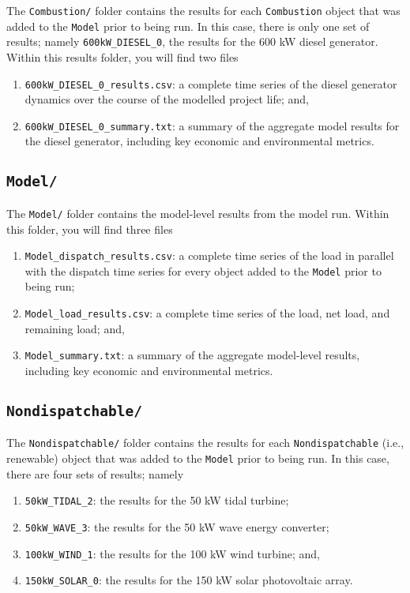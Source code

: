\documentclass[12pt, letterpaper]{report}
\begin{document}
The \texttt{Combustion/} folder contains the results for each \texttt{Combustion} object that was added to the \texttt{Model} prior to being run. In this case, there is only one set of results; namely \texttt{600kW\_DIESEL\_0}, the results for the 600 kW diesel generator. Within this results folder, you will find two files

\begin{enumerate}
    \item \texttt{600kW\_DIESEL\_0\_results.csv}: a complete time series of the diesel generator dynamics over the course of the modelled project life; and,
    \item \texttt{600kW\_DIESEL\_0\_summary.txt}: a summary of the aggregate model results for the diesel generator, including key economic and environmental metrics.
\end{enumerate}

\subsection{\texttt{Model/}}

The \texttt{Model/} folder contains the model-level results from the model run. Within this folder, you will find three files

\begin{enumerate}
    \item \texttt{Model\_dispatch\_results.csv}: a complete time series of the load in parallel with the dispatch time series for every object added to the \texttt{Model} prior to being run;
    \item \texttt{Model\_load\_results.csv}: a complete time series of the load, net load, and remaining load; and,
    \item \texttt{Model\_summary.txt}: a summary of the aggregate model-level results, including key economic and environmental metrics.
\end{enumerate}

\subsection{\texttt{Nondispatchable/}}

The \texttt{Nondispatchable/} folder contains the results for each \texttt{Nondispatchable} (i.e., renewable) object that was added to the \texttt{Model} prior to being run. In this case, there are four sets of results; namely

\begin{enumerate}
    \item \texttt{50kW\_TIDAL\_2}: the results for the 50 kW tidal turbine;
    \item \texttt{50kW\_WAVE\_3}: the results for the 50 kW wave energy converter;
    \item \texttt{100kW\_WIND\_1}: the results for the 100 kW wind turbine; and,
    \item \texttt{150kW\_SOLAR\_0}: the results for the 150 kW solar photovoltaic array.
\end{enumerate}
\end{document}

